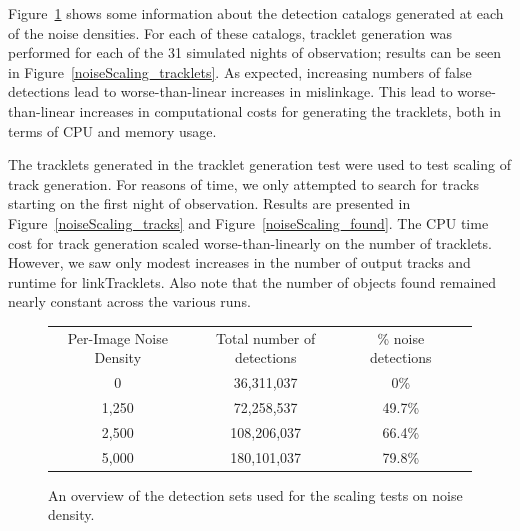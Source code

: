 Figure~\ref{noiseScaling_detections} shows some information about the
detection catalogs generated at each of the noise densities.  For each
of these catalogs, tracklet generation was performed for each of the
31 simulated nights of observation; results can be seen in
Figure~\ref{noiseScaling_tracklets}.  As expected, increasing numbers
of false detections lead to worse-than-linear increases in mislinkage.
This lead to worse-than-linear increases in computational costs for generating the
tracklets, both in terms of CPU and memory usage.

The tracklets generated in the tracklet generation test were used to
test scaling of track generation.  For reasons of time, we only
attempted to search for tracks starting on the first night of
observation.  Results are presented in
Figure~\ref{noiseScaling_tracks} and Figure~\ref{noiseScaling_found}.
The CPU time cost for track generation scaled worse-than-linearly on
the number of tracklets.  However, we saw only modest increases in the
number of output tracks and runtime for linkTracklets.  Also note that
the number of objects found remained nearly constant across the
various runs.



\begin{figure}[ht!]
\centering

\begin{tabular}{|c c c c|}
\hline
Per-Image Noise Density & Total number of detections & \% noise detections &  \\ 
0             & 36,311,037             & 0\%                          & \\
1,250         & 72,258,537             & 49.7\%          & \\
2,500         & 108,206,037            & 66.4\%          & \\ 
5,000         & 180,101,037            & 79.8\%          & \\
\hline
\end{tabular}
\caption{An overview of the detection sets used for the scaling tests on noise density.}
\label{noiseScaling_detections}
\end{figure}


